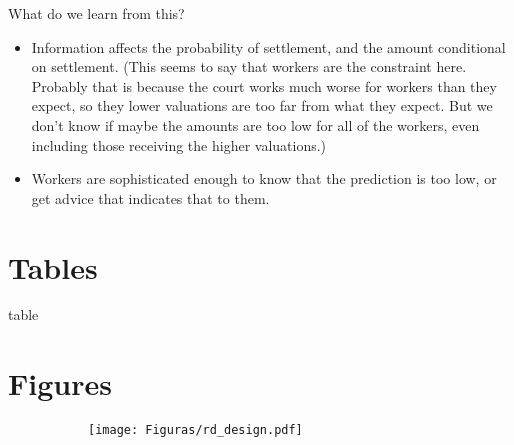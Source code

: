 \documentclass[oneside,11pt]{article}
\begin{document}
What do we learn from this? 
\begin{itemize}
    \item Information affects the probability of settlement, and the amount conditional on settlement. (This seems to say that workers are the constraint here. Probably that is because the court works much worse for workers than they expect, so they lower valuations are too far from what they expect. But we don't know if maybe the amounts are too low for all of the workers, even including those receiving the higher valuations.)
    \item Workers are sophisticated enough to know that the prediction is too low, or get advice that indicates that to them.
\end{itemize}




\newpage


\clearpage

%
%






\newpage
\singlespacing

\section{Tables}

\begin{table}[H]
\caption{ table}
\label{}
\begin{center}
\end{center}
 \scriptsize 
\end{table}


\section{Figures}


\begin{figure}[H]
     \caption{RD design}
    \label{rd_design}
\begin{center}
\begin{subfigure}{\textwidth}
        \texttt{[image: Figuras/rd\_design.pdf]}
    \end{subfigure}
  \end{center}
    \scriptsize 
\end{figure}
\end{document}
